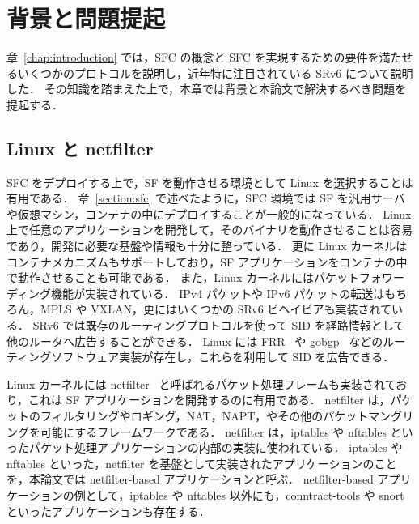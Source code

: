 \chapter{背景と問題提起}
\label{chap:related_works}
章~\ref*{chap:introduction} では，SFC の概念と SFC を実現するための要件を満たせるいくつかのプロトコルを説明し，近年特に注目されている SRv6 について説明した．
その知識を踏まえた上で，本章では背景と本論文で解決するべき問題を提起する．

\section{Linux と netfilter}
\label{section:linux-and-netfilter}
SFC をデプロイする上で，SF を動作させる環境として Linux を選択することは有用である．
章~\ref*{section:sfc} で述べたように，SFC 環境では SF を汎用サーバや仮想マシン，コンテナの中にデプロイすることが一般的になっている．
Linux 上で任意のアプリケーションを開発して，そのバイナリを動作させることは容易であり，開発に必要な基盤や情報も十分に整っている．
更に Linux カーネルはコンテナメカニズムもサポートしており，SF アプリケーションをコンテナの中で動作させることも可能である．
また，Linux カーネルにはパケットフォワーディング機能が実装されている．
IPv4 パケットや IPv6 パケットの転送はもちろん，MPLS や VXLAN，更にはいくつかの SRv6 ビヘイビアも実装されている．
SRv6 では既存のルーティングプロトコルを使って SID を経路情報として他のルータへ広告することができる．
Linux には FRR~\cite{frr} や gobgp~\cite{gobgp} などのルーティングソフトウェア実装が存在し，これらを利用して SID を広告できる．

Linux カーネルには netfilter~\cite*{netfilter} と呼ばれるパケット処理フレームも実装されており，これは SF アプリケーションを開発するのに有用である．
netfilter は，パケットのフィルタリングやロギング，NAT，NAPT，やその他のパケットマングリングを可能にするフレームワークである．
netfilter は，iptables や nftables といったパケット処理アプリケーションの内部の実装に使われている．
iptables や nftables といった，netfilter を基盤として実装されたアプリケーションのことを，本論文では netfilter-based アプリケーションと呼ぶ．
netfilter-based アプリケーションの例として，iptables や nftables 以外にも，conntract-tools\cite{conntract-tools} や snort\cite{snort} といったアプリケーションも存在する．

